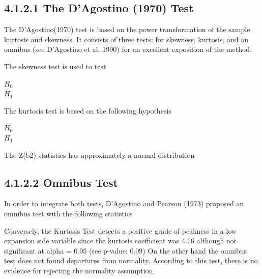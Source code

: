 \documentclass[]{beamer}
\begin{document}
\subsection{4.1.2.1 The D’Agostino (1970) Test}
\begin{frame}[fragile]

The D’Agostino(1970) test is based on the power transformation of the sample
kurtosis and skewness. It consists of three tests: for skewness, kurtosis, and an
omnibus (see D’Agostino et al. 1990) for an excellent exposition of the method.
\end{frame}
\begin{frame}[fragile]
The skewness test is used to test

\begin{description}
	\item[$H_0$] 
	\item[$H_1$]
\end{description}



\end{frame}
\begin{frame}


The kurtosis test is based on the following hypothesis
\begin{description}
	\item[$H_0$] 
	\item[$H_1$]
\end{description}




The Z(b2) statistics has approximately a normal distribution
\end{frame}
\subsection{4.1.2.2 Omnibus Test}
\begin{frame}[fragile]

In order to integrate both tests, D’Agostino and Pearson (1973) proposed an
omnibus test with the following statistics



Conversely, the Kurtosis Test detects a positive grade of peakness in a low
expansion side variable since the kurtosis coefficient was 4.16 although not significant
at alpha = 0.05 (see p-value: 0.09)
On the other hand the omnibus test does not found departures from normality.
According to this test, there is no evidence for rejecting the normality
assumption.
\end{frame}
\end{document}
